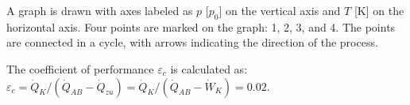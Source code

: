 A graph is drawn with axes labeled as \( p \) [\( p_0 \)] on the vertical axis and \( T \) [K] on the horizontal axis. Four points are marked on the graph: 1, 2, 3, and 4. The points are connected in a cycle, with arrows indicating the direction of the process.

The coefficient of performance \( \varepsilon_c \) is calculated as:  
\( \varepsilon_c = \dot{Q}_K / (\dot{Q}_{AB} - \dot{Q}_{zu}) = \dot{Q}_K / (\dot{Q}_{AB} - \dot{W}_K) = 0.02 \).